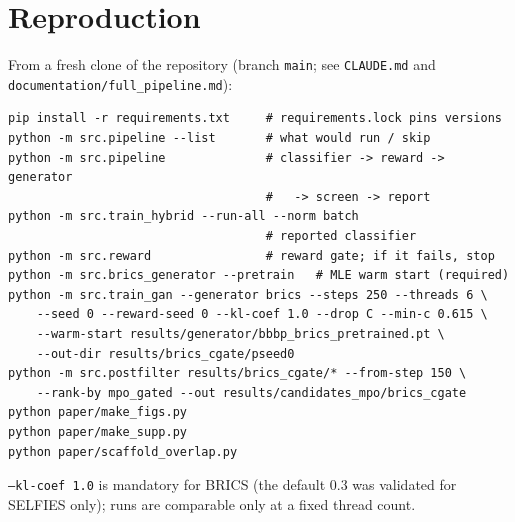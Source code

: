 \documentclass[10pt,letterpaper]{article}
\begin{document}
\section{Reproduction}
From a fresh clone of the repository (branch \texttt{main}; see \texttt{CLAUDE.md} and \texttt{documentation/full\_pipeline.md}):
\begin{verbatim}
pip install -r requirements.txt     # requirements.lock pins versions
python -m src.pipeline --list       # what would run / skip
python -m src.pipeline              # classifier -> reward -> generator
                                    #   -> screen -> report
python -m src.train_hybrid --run-all --norm batch
                                    # reported classifier
python -m src.reward                # reward gate; if it fails, stop
python -m src.brics_generator --pretrain   # MLE warm start (required)
python -m src.train_gan --generator brics --steps 250 --threads 6 \
    --seed 0 --reward-seed 0 --kl-coef 1.0 --drop C --min-c 0.615 \
    --warm-start results/generator/bbbp_brics_pretrained.pt \
    --out-dir results/brics_cgate/pseed0
python -m src.postfilter results/brics_cgate/* --from-step 150 \
    --rank-by mpo_gated --out results/candidates_mpo/brics_cgate
python paper/make_figs.py
python paper/make_supp.py
python paper/scaffold_overlap.py
\end{verbatim}
\texttt{--kl-coef 1.0} is mandatory for BRICS (the default $0.3$ was validated for SELFIES only); runs are comparable only at a fixed thread count.
\end{document}
